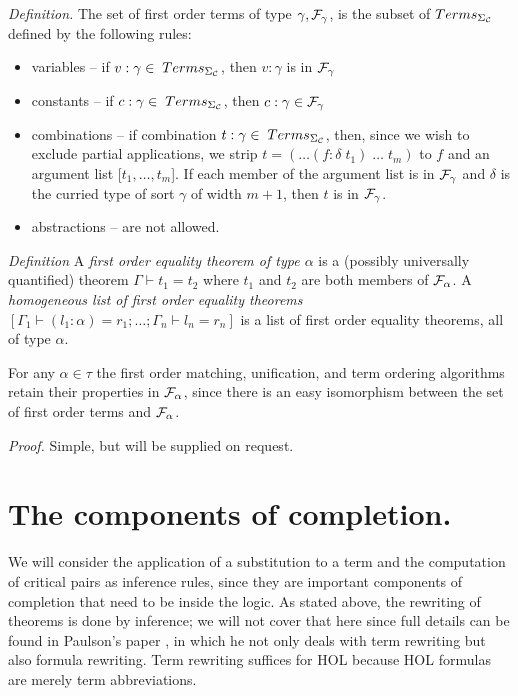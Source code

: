 {\em Definition.} The set of first order terms of type $\gamma, {\cal
F}_\gamma$, is the subset of $Terms_{\Sigma_{\cal C}}$ defined by the following
rules:
\begin{itemize}
\item variables -- if $v:\gamma \in \;Terms_{\Sigma_{\cal C}}$, then
$v:\gamma$ is in ${\cal F}_\gamma$ 
\item constants -- if $c:\gamma \in \;Terms_{\Sigma_{\cal C}}$, then
$c:\gamma \in {\cal F}_\gamma$ 
\item combinations -- if combination $t:\gamma \in \;Terms_{\Sigma_{\cal C}}$,
then, since we wish to exclude partial applications, we strip $t =
(\ldots(f\!:\!\delta\; t_1)\;\ldots\;t_m)$ to $f$ and an argument list [$t_1,
\ldots, t_m$]. If each member of the argument list is in ${\cal F}_\gamma$ and
$\delta$ is the curried type of sort $\gamma$ of width $m+1$, then $t$ is in
${\cal F}_\gamma$. 
\item abstractions -- are not allowed.
\end{itemize}

{\em Definition} A {\it first order equality theorem of type $\alpha$} is a
(possibly universally quantified) theorem $\Gamma \vdash t_1 = t_2$ where $t_1$
and $t_2$ are both members of ${\cal F}_\alpha$. A {\it homogeneous list of
first order equality theorems} $[\Gamma_1 \vdash (l_1:\alpha) = r_1; \ldots;
\Gamma_n \vdash l_n = r_n]$ is a list of first order equality theorems, all of
type $\alpha$.

For any $\alpha \in \tau$ the first order matching, unification, and term
ordering algorithms retain their properties in ${\cal F}_\alpha$, since there
is an easy isomorphism between the set of first order terms and ${\cal
F}_\alpha$.

{\it Proof.} Simple, but will be supplied on request.


\section{The components of completion.}

We will consider the application of a substitution to a term and the
computation of critical pairs as inference rules, since they are important
components of completion that need to be inside the logic. As stated above, the
rewriting of theorems is done by inference; we will not cover that here since
full details can be found in Paulson's paper \cite{paulson83}, in which he not
only deals with term rewriting but also formula rewriting. Term rewriting
suffices for HOL because HOL formulas are merely term abbreviations.

